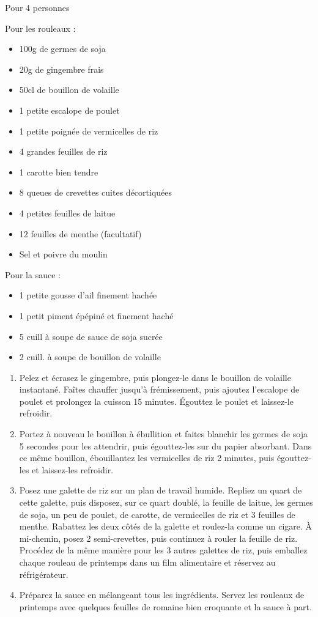 \bigskip
{}
{Pour 4 personnes}{Pour les rouleaux : \begin{itemize}
	\item 100g de germes de soja
	\item 20g de gingembre frais
	\item 50cl de bouillon de volaille
	\item 1 petite escalope de poulet
	\item 1 petite poignée de vermicelles de riz
	\item 4 grandes feuilles de riz
	\item 1 carotte bien tendre
	\item 8 queues de crevettes cuites décortiquées
	\item 4 petites feuilles de laitue
	\item 12 feuilles de menthe (facultatif)
	\item Sel et poivre du moulin
\end{itemize}
Pour la sauce : \begin{itemize}
	\item 1 petite gousse d'ail finement hachée
	\item 1 petit piment épépiné et finement haché
	\item 5 cuill à soupe de sauce de soja sucrée
	\item 2 cuill. à soupe de bouillon de volaille
\end{itemize}}
{\phantom{.}

\bigskip
\begin{enumerate}
	\item Pelez et écrasez le gingembre, puis plongez-le dans le bouillon de volaille instantané. Faîtes chauffer jusqu'à frémissement, puis ajoutez l'escalope de poulet et prolongez la cuisson 15 minutes. Égouttez le poulet et laissez-le refroidir.
	\item Portez à nouveau le bouillon à ébullition et faites blanchir les germes de soja 5 secondes pour les attendrir, puis égouttez-les sur du papier absorbant. Dans ce même bouillon, ébouillantez les vermicelles de riz 2 minutes, puis égouttez-les et laissez-les refroidir.
	\item Posez une galette de riz sur un plan de travail humide. Repliez un quart de cette galette, puis disposez, sur ce quart doublé, la feuille de laitue, les germes de soja, un peu de poulet, de carotte, de vermicelles de riz et 3 feuilles de menthe. Rabattez les deux côtés de la galette et roulez-la comme un cigare. À mi-chemin, posez 2 semi-crevettes, puis continuez à rouler la feuille de riz. Procédez de la même manière pour les 3 autres galettes de riz, puis emballez chaque rouleau de printemps dans un film alimentaire et réservez au réfrigérateur. 
	\item Préparez la sauce en mélangeant tous les ingrédients. Servez les rouleaux de printemps avec quelques feuilles de romaine bien croquante et la sauce à part.
\end{enumerate}

\medskip
\phantom{.}}
